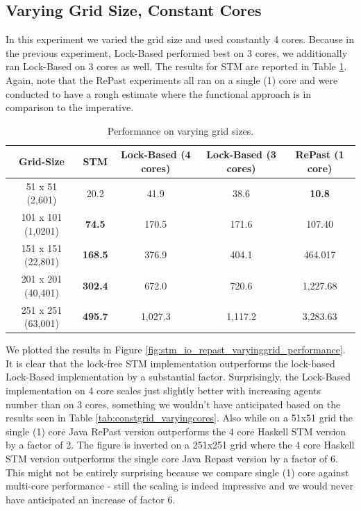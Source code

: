 \subsection{Varying Grid Size, Constant Cores}
In this experiment we varied the grid size and used constantly 4 cores. Because in the previous experiment, Lock-Based performed best on 3 cores, we additionally ran Lock-Based on 3 cores as well. The results for STM are reported in Table \ref{tab:varyinggrid_constcores}. Again, note that the RePast experiments all ran on a single (1) core and were conducted to have a rough estimate where the functional approach is in comparison to the imperative.

\begin{table}
	\centering
  	\begin{tabular}{ c || c | c | c | c }
        Grid-Size          & STM              & Lock-Based (4 cores) & Lock-Based (3 cores) & RePast (1 core) \\ \hline \hline 
   		51 x 51 (2,601)    & 20.2             & 41.9                 & 38.6                 & \textbf{10.8}   \\ \hline
   		101 x 101 (1,0201) & \textbf{74.5}    & 170.5                & 171.6                & 107.40          \\ \hline
   		151 x 151 (22,801) & \textbf{168.5}   & 376.9                & 404.1                & 464.017         \\ \hline
   		201 x 201 (40,401) & \textbf{302.4}   & 672.0                & 720.6                & 1,227.68        \\ \hline
   		251 x 251 (63,001) & \textbf{495.7}   & 1,027.3              & 1,117.2              & 3,283.63        \\ \hline \hline
  	\end{tabular}

  	\caption{Performance on varying grid sizes.}
	\label{tab:varyinggrid_constcores}
\end{table}

We plotted the results in Figure \ref{fig:stm_io_repast_varyinggrid_performance}. It is clear that the lock-free STM implementation outperforms the lock-based Lock-Based implementation by a substantial factor. Surprisingly, the Lock-Based implementation on 4 core scales just slightly better with increasing agents number than on 3 cores, something we wouldn't have anticipated based on the results seen in Table \ref{tab:constgrid_varyingcores}. Also  while on a 51x51 grid the single (1) core Java RePast version outperforms the 4 core Haskell STM version by a factor of 2. The figure is inverted on a 251x251 grid where the 4 core Haskell STM version outperforms the single core Java Repast version by a factor of 6. This might not be entirely surprising because we compare single (1) core against multi-core performance - still the scaling is indeed impressive and we would never have anticipated an increase of factor 6.

